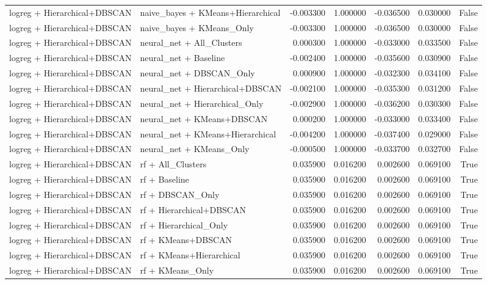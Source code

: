\begin{tabular}{llrrrrr}
logreg + Hierarchical+DBSCAN & naive_bayes + KMeans+Hierarchical & -0.003300 & 1.000000 & -0.036500 & 0.030000 & False \\
logreg + Hierarchical+DBSCAN & naive_bayes + KMeans_Only & -0.003300 & 1.000000 & -0.036500 & 0.030000 & False \\
logreg + Hierarchical+DBSCAN & neural_net + All_Clusters & 0.000300 & 1.000000 & -0.033000 & 0.033500 & False \\
logreg + Hierarchical+DBSCAN & neural_net + Baseline & -0.002400 & 1.000000 & -0.035600 & 0.030900 & False \\
logreg + Hierarchical+DBSCAN & neural_net + DBSCAN_Only & 0.000900 & 1.000000 & -0.032300 & 0.034100 & False \\
logreg + Hierarchical+DBSCAN & neural_net + Hierarchical+DBSCAN & -0.002100 & 1.000000 & -0.035300 & 0.031200 & False \\
logreg + Hierarchical+DBSCAN & neural_net + Hierarchical_Only & -0.002900 & 1.000000 & -0.036200 & 0.030300 & False \\
logreg + Hierarchical+DBSCAN & neural_net + KMeans+DBSCAN & 0.000200 & 1.000000 & -0.033000 & 0.033400 & False \\
logreg + Hierarchical+DBSCAN & neural_net + KMeans+Hierarchical & -0.004200 & 1.000000 & -0.037400 & 0.029000 & False \\
logreg + Hierarchical+DBSCAN & neural_net + KMeans_Only & -0.000500 & 1.000000 & -0.033700 & 0.032700 & False \\
logreg + Hierarchical+DBSCAN & rf + All_Clusters & 0.035900 & 0.016200 & 0.002600 & 0.069100 & True \\
logreg + Hierarchical+DBSCAN & rf + Baseline & 0.035900 & 0.016200 & 0.002600 & 0.069100 & True \\
logreg + Hierarchical+DBSCAN & rf + DBSCAN_Only & 0.035900 & 0.016200 & 0.002600 & 0.069100 & True \\
logreg + Hierarchical+DBSCAN & rf + Hierarchical+DBSCAN & 0.035900 & 0.016200 & 0.002600 & 0.069100 & True \\
logreg + Hierarchical+DBSCAN & rf + Hierarchical_Only & 0.035900 & 0.016200 & 0.002600 & 0.069100 & True \\
logreg + Hierarchical+DBSCAN & rf + KMeans+DBSCAN & 0.035900 & 0.016200 & 0.002600 & 0.069100 & True \\
logreg + Hierarchical+DBSCAN & rf + KMeans+Hierarchical & 0.035900 & 0.016200 & 0.002600 & 0.069100 & True \\
logreg + Hierarchical+DBSCAN & rf + KMeans_Only & 0.035900 & 0.016200 & 0.002600 & 0.069100 & True \\

\end{tabular}

